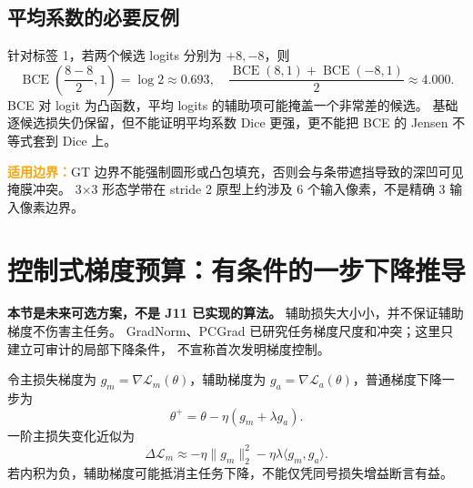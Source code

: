 \documentclass[UTF8,a4paper,11pt,fontset=windows]{ctexart}
\newcommand{\BCE}{\operatorname{BCE}}
\newcommand{\limitation}[1]{\par\noindent\textcolor{orange}{\textbf{适用边界：}}#1\par}
\begin{document}
\subsection{平均系数的必要反例}
针对标签 1，若两个候选 logits 分别为 \(+8,-8\)，则
\begin{equation}
\BCE\left(\frac{8-8}{2},1\right)=\log2\approx0.693,
\quad\frac{\BCE(8,1)+\BCE(-8,1)}2\approx4.000.
\label{eq:meanbce}
\end{equation}
BCE 对 logit 为凸函数，平均 logits 的辅助项可能掩盖一个非常差的候选。
基础逐候选损失仍保留，但不能证明平均系数 Dice 更强，更不能把 BCE 的 Jensen 不等式套到 Dice 上。
\limitation{GT 边界不能强制圆形或凸包填充，否则会与条带遮挡导致的深凹可见掩膜冲突。
3\(\times\)3 形态学带在 stride 2 原型上约涉及 6 个输入像素，不是精确 3 输入像素边界。}
\clearpage

\section{控制式梯度预算：有条件的一步下降推导}
\label{sec:control}
\textbf{本节是未来可选方案，不是 J11 已实现的算法。}
辅助损失大小小，并不保证辅助梯度不伤害主任务。
GradNorm、PCGrad 已研究任务梯度尺度和冲突\cite{gradnorm,pcgrad}；这里只建立可审计的局部下降条件，
不宣称首次发明梯度控制。

令主损失梯度为 \(g_m=\nabla\mathcal L_m(\theta)\)，辅助梯度为
\(g_a=\nabla\mathcal L_a(\theta)\)，普通梯度下降一步为
\begin{equation}
\theta^+=\theta-\eta(g_m+\lambda g_a).
\label{eq:gd}
\end{equation}
一阶主损失变化近似为
\begin{equation}
\Delta\mathcal L_m\approx-\eta\|g_m\|_2^2
-\eta\lambda\langle g_m,g_a\rangle.
\label{eq:dotgradient}
\end{equation}
若内积为负，辅助梯度可能抵消主任务下降，不能仅凭同号损失增益断言有益。
\end{document}

